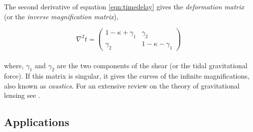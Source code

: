 \documentclass[
  11pt,
  twoside,
  openright,
  titlepage,
  headings=optiontoheadandtoc
]{scrbook}
\begin{document}
The second derivative of equation \ref{eqn:timedelay} gives the
{\it deformation matrix} (or the {\it inverse magnification matrix}),

\begin{equation}
	\nabla^2 t = \begin{pmatrix}
 				 1-\kappa+\gamma_1 &  \gamma_2 \\
  					\gamma_2 & 1-\kappa-\gamma_1
 				\end{pmatrix}
\end{equation}
\\
where, $\gamma_1$ and $\gamma_2$ are the two components of the shear (or the tidal
gravitational force). If this matrix is singular, it gives the curves of the
infinite magnifications, also known as {\it caustics}.
For an extensive review on the theory of gravitational
lensing see \citep{1992grle.book.....S,2001stgl.book.....P,2006glsw.conf.....M}.


\subsection{Applications}
\end{document}
